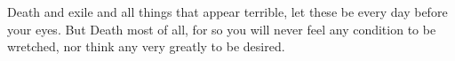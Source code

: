 Death and  exile and all  things that appear terrible,  let these be  every day
before  your eyes.  But Death  most of  all,  for so  you will  never feel  any
condition to be wretched, nor think any very greatly to be desired.
